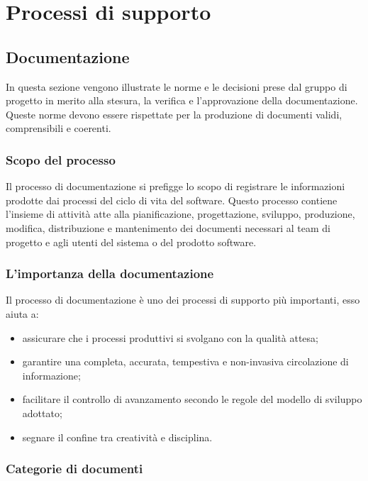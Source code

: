 \section{Processi di supporto}

	\subsection{Documentazione} \label{documentazione}
		In questa sezione vengono illustrate le norme e le decisioni prese dal gruppo di progetto
		in merito alla stesura, la verifica e l'approvazione della documentazione. 
		Queste norme devono essere rispettate per la produzione di documenti validi, comprensibili 
		e coerenti.

		\subsubsection{Scopo del processo}

			Il processo di documentazione si prefigge lo scopo di registrare le informazioni prodotte
			dai processi del ciclo di vita del software. Questo processo contiene l'insieme
			di attività atte alla pianificazione, progettazione, sviluppo, produzione, modifica, 
			distribuzione e mantenimento dei documenti necessari al team di
			progetto e agli utenti del sistema o del prodotto software.

		\subsubsection{L'importanza della documentazione}

			Il processo di documentazione è uno dei processi di supporto più importanti, esso aiuta a:

			\begin{itemize}
				\item assicurare che i processi produttivi si svolgano con la qualità attesa;
				\item garantire una completa, accurata, tempestiva e non-invasiva circolazione 
				di informazione;
				\item facilitare il controllo di avanzamento secondo le regole del modello di 
				sviluppo adottato;
				\item  segnare il confine tra creatività e disciplina.
			\end{itemize}	

		\subsubsection{Categorie di documenti}

